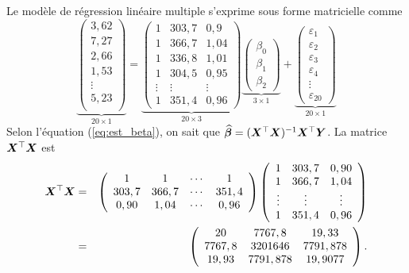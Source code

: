 Le modèle de régression linéaire multiple s'exprime sous forme matricielle comme
$$
\underbrace{\left(
\begin{array}{c}
3,62  \\
7,27  \\
2,66 \\
1,53 \\
\vdots \\
5,23  \\
\end{array} \right)}_{20\times 1}
 =  \underbrace{\left(\begin{array}{ccc}
            1	&      303,7  & 0,9     \\
            1	&      366,7  & 1,04    \\
            1 &         336,8 & 1,01 \\
            1 &           304,5 & 0,95 \\
            \vdots & \vdots & \vdots   \\
            1	&      351,4  & 0,96
\end{array}\right)}_{20\times 3}
\underbrace{\left(\begin{array}{c}
\beta_0 \\
\beta_1 \\
\beta_2
\end{array} \right)}_{3\times 1}+
\underbrace{\left(\begin{array}{c}
\varepsilon_1 \\
\varepsilon_2 \\
\varepsilon_3 \\
\varepsilon_4 \\
\vdots \\
\varepsilon_{20}
 \end{array}
 \right)}_{20\times 1}
 $$
Selon l'équation (\ref{eq:est_beta}), on sait que $\widehat{\bm\beta}=(\bm{X}^\top\bm{X})^{-1}\bm{X}^\top \bm{Y}$.
La matrice $\bm{X}^\top\bm{X}$ est
\begin{eqnarray*}
\bm{X}^\top\bm{X} & = & \left(
\begin{array}{cccc}
1 & 1 & \cdots & 1 \\
303,7 & 366,7 & \cdots & 351,4 \\
0,90 & 1,04 & \cdots & 0,96
\end{array}
\right)
\left(
\begin{array}{ccc}
1 & 303,7 & 0,90 \\
1 & 366,7 & 1,04 \\
\vdots & \vdots & \vdots \\
1 & 351,4 & 0,96
\end{array}
\right) \\
& = & \left(
\begin{array}{ccc}
20 & 7767,8 & 19,33 \\
7767,8 & 3201646 & 7791,878 \\
19,93 & 7791,878 & 19,9077
\end{array}
\right).
\end{eqnarray*}

